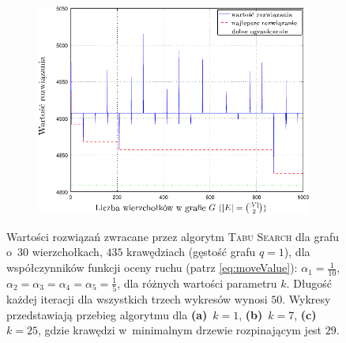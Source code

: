 \begin{figure}[!htbp]
\begin{subfigure}[b]{0.32\textwidth}
		\includegraphics[width=\textwidth]{Chapter_VI/RRIMST7-example/RRIMST7_psfrag}
		\caption{}
		\label{fig:rrimst2:c}
	\end{subfigure}
	\hfill\null
	\caption{
		Wartości rozwiązań zwracane przez algorytm \textsc{Tabu Search} dla grafu o~$30$ wierzchołkach, $435$ krawędziach (gęstość grafu $q = 1$), dla współczynników funkcji oceny ruchu (patrz \ref{eq:moveValue}): $\alpha_{1} = \frac{1}{10}$, $\alpha_{2} = \alpha_{3} = \alpha_{4} = \alpha_{5} = \frac{1}{5}$, dla różnych wartości parametru $k$.
		Długość każdej iteracji dla wszystkich trzech wykresów wynosi $50$.
		Wykresy przedstawiają przebieg algorytmu dla
		\textbf{(a)}~$k = 1$, 
		\textbf{(b)}~$k = 7$,
		\textbf{(c)}~$k = 25$, gdzie krawędzi w~minimalnym drzewie rozpinającym jest $29$.
	}
	\label{fig:rrimst2}
\end{figure}

